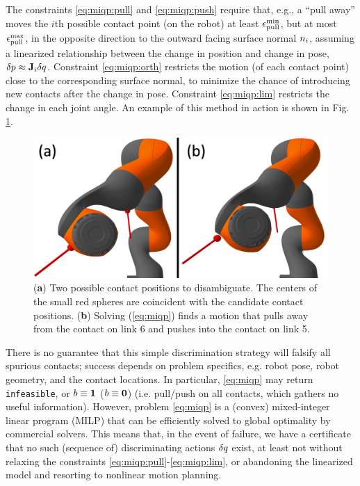 The constraints \eqref{eq:miqp:pull} and \eqref{eq:miqp:push} require that, e.g., a ``pull away'' moves the $i$th possible contact point (on the robot) at least $\epsilon_\text{pull}^\text{min}$, but at most $\epsilon_\text{pull}^\text{max}$, in the opposite direction to the outward facing surface normal $n_i$, assuming a linearized relationship between the change in position and change in pose, 
$\delta p\approx\mathbf{J}_i{\delta q}$.
Constraint \eqref{eq:miqp:orth} restricts the motion (of each contact point) close to the corresponding surface normal, to minimize the chance of introducing new contacts after the change in pose.
Constraint \eqref{eq:miqp:lim} restricts the change in each joint angle.
An example of this method in action is shown in Fig. \ref{fig:active_contact_discrimination}.
\begin{figure}[h]
\centering
\includegraphics[width=0.75\linewidth]{figures/05_force_from_torque/active_contact_discrimination.png}
\caption{(\textbf{a}) Two possible contact positions to disambiguate. The centers of the small red spheres are coincident with the candidate contact positions. (\textbf{b}) Solving (\ref{eq:miqp}) finds a motion that pulls away from the contact on link 6 and pushes into the contact on link 5. }
\label{fig:active_contact_discrimination}
\end{figure}

There is no guarantee that this simple discrimination strategy will falsify all spurious contacts; success depends on problem specifics, e.g. robot pose, robot geometry, and the contact locations.
In particular, \eqref{eq:miqp} may return \texttt{infeasible}, or $b\equiv\mathbf{1}$ ($b\equiv\mathbf{0}$) (i.e. pull/push on all contacts, which gathers no useful information). 
However, problem \eqref{eq:miqp} is a (convex) mixed-integer linear program (MILP) that can be efficiently solved to global optimality by commercial solvers. 
This means that, in the event of failure, we have a certificate that no such (sequence of) discriminating actions ${\delta q}$ exist, at least not without relaxing the constraints \eqref{eq:miqp:pull}-\eqref{eq:miqp:lim}, or abandoning the linearized model and resorting to 
nonlinear motion planning.  

